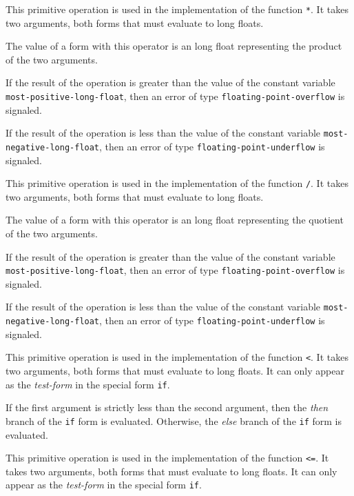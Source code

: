 
This primitive operation is used in the implementation of the
\commonlisp{} function \texttt{*}.  It takes two arguments, both forms
that must evaluate to long floats.

The value of a form with this operator is an long float
representing the product of the two arguments.

If the result of the operation is greater than the value of the
constant variable \texttt{most-positive-long-float}, then an error of
type \texttt{floating-point-overflow} is signaled.

If the result of the operation is less than the value of the constant
variable \texttt{most-negative-long-float}, then an error of type
\texttt{floating-point-underflow} is signaled.


This primitive operation is used in the implementation of the
\commonlisp{} function \texttt{/}.  It takes two arguments, both forms
that must evaluate to long floats.

The value of a form with this operator is an long float
representing the quotient of the two arguments.

If the result of the operation is greater than the value of the
constant variable \texttt{most-positive-long-float}, then an error of
type \texttt{floating-point-overflow} is signaled.

If the result of the operation is less than the value of the constant
variable \texttt{most-negative-long-float}, then an error of type
\texttt{floating-point-underflow} is signaled.


This primitive operation is used in the implementation of the
\commonlisp{} function \texttt{<}.  It takes two arguments, both forms
that must evaluate to long floats.  It can only appear as the
\emph{test-form} in the special form \texttt{if}.

If the first argument is strictly less than the second argument, then
the \emph{then} branch of the \texttt{if} form is evaluated.
Otherwise, the \emph{else} branch of the \texttt{if} form is
evaluated.


This primitive operation is used in the implementation of the
\commonlisp{} function \texttt{<=}.  It takes two arguments, both forms
that must evaluate to long floats.  It can only appear as the
\emph{test-form} in the special form \texttt{if}.


